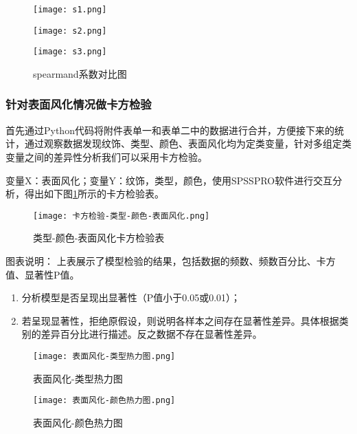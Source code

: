 \begin{figure}[h]
	\centering
	\begin{minipage}[b]{0.3\linewidth}
		\texttt{[image: s1.png]}
	\end{minipage}
	\begin{minipage}[b]{0.3\linewidth}
		\texttt{[image: s2.png]}
	\end{minipage}
	\begin{minipage}[b]{0.3\linewidth}
		\texttt{[image: s3.png]}
	\end{minipage}
	\setlength{\abovecaptionskip}{3pt}%
	\caption{spearmand系数对比图}
\end{figure}

\subsubsection{针对表面风化情况做卡方检验}
首先通过Python代码将附件表单一和表单二中的数据进行合并，方便接下来的统计，通过观察数据发现纹饰、类型、颜色、表面风化均为定类变量，针对多组定类变量之间的差异性分析我们可以采用卡方检验。

变量X：表面风化；变量Y：纹饰，类型，颜色，使用SPSSPRO软件进行交互分析，得出如下图\ref{p-2}所示的卡方检验表。

\begin{figure}[!htbp]
	\centering
	\texttt{[image: 卡方检验-类型-颜色-表面风化.png]}
	\setlength{\abovecaptionskip}{3pt}%
	\caption{类型-颜色-表面风化卡方检验表}
	\label{p-2}
\end{figure}

图表说明：
上表展示了模型检验的结果，包括数据的频数、频数百分比、卡方值、显著性P值。
\begin{enumerate}
	\item 分析模型是否呈现出显著性（P值小于0.05或0.01）；
	\item 若呈现显著性，拒绝原假设，则说明各样本之间存在显著性差异。具体根据类别的差异百分比进行描述。反之数据不存在显著性差异。
\end{enumerate}


\begin{figure}[h]
	\centering
	\begin{minipage}[b]{0.45\linewidth}
		\texttt{[image: 表面风化-类型热力图.png]}
		\setlength{\abovecaptionskip}{3pt}%
		\caption{表面风化-类型热力图}
		\label{p-3}
	\end{minipage}
	\begin{minipage}[b]{0.45\linewidth}
		\texttt{[image: 表面风化-颜色热力图.png]}
		\setlength{\abovecaptionskip}{3pt}%
		\caption{表面风化-颜色热力图}
		\label{p-4}
	\end{minipage}
\end{figure}


